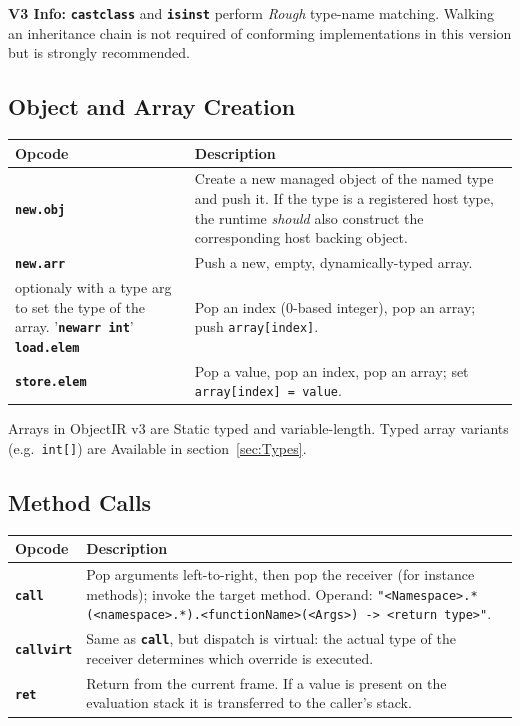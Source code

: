 \documentclass[11pt,a4paper]{article}
\newcommand{\code}[1]{\texttt{\small #1}}
\newcommand{\opcode}[1]{\textbf{\texttt{#1}}}
\begin{document}
\begin{infobox}
\textbf{V3 Info:} \opcode{castclass} and \opcode{isinst} perform
\emph{Rough} type-name matching. Walking an inheritance chain is not required
of conforming implementations in this version but is strongly recommended.
\end{infobox}

\subsection{Object and Array Creation}

\begin{longtable}{lp{10.5cm}}
  \toprule
  \textbf{Opcode}  & \textbf{Description} \\
  \midrule
  \endhead
  \opcode{new.obj}  &
    Create a new managed object of the named type and push it. If the type
    is a registered host type, the runtime \textit{should} also construct
    the corresponding host backing object. \\
  \opcode{new.arr}  &
    Push a new, empty, dynamically-typed array. \\
    optionaly with a type arg to set the type of the array.
    '\opcode{newarr int}'
  \opcode{load.elem}  &
    Pop an index (0-based integer), pop an array;
    push \texttt{array[index]}. \\
  \opcode{store.elem}  &
    Pop a value, pop an index, pop an array;
    set \texttt{array[index] = value}. \\
  \bottomrule
\end{longtable}

\begin{notebox}
Arrays in ObjectIR v3 are Static typed and variable-length. Typed array variants
(e.g.\ \texttt{int[]}) are Available in section~\ref{sec:Types}.
\end{notebox}

\subsection{Method Calls}

\begin{longtable}{lp{10.5cm}}
  \toprule
  \textbf{Opcode}   & \textbf{Description} \\
  \midrule
  \endhead
  \opcode{call}     &
    Pop arguments left-to-right, then pop the receiver (for instance
    methods); invoke the target method.
    Operand: \code{"<Namespace>.*(<namespace>.*).<functionName>(<Args>) -> <return type>"}. \\
  \opcode{callvirt} &
    Same as \opcode{call}, but dispatch is virtual: the actual type of the
    receiver determines which override is executed. \\
  \opcode{ret}      &
    Return from the current frame. If a value is present on the evaluation
    stack it is transferred to the caller's stack. \\
  \bottomrule
\end{longtable}
\end{document}
